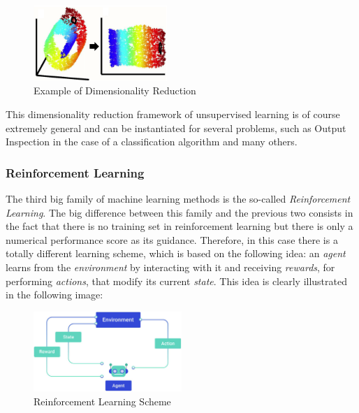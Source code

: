 \begin{itemize}
            \vspace{5mm}

            \begin{figure}[h]
                  \centering
                  \includegraphics[width=0.45\textwidth]{../img/Dim_reduction_example}
                  \caption{Example of Dimensionality Reduction}
            \end{figure}

            \vspace{5mm}

            This dimensionality reduction framework of unsupervised
            learning is of course extremely general and can be
            instantiated for several problems, such as Output Inspection
            in the case of a classification algorithm and many others.
\end{itemize}

\subsubsection{Reinforcement Learning}

The third big family of machine learning methods is the so-called
\emph{Reinforcement Learning}. The big difference between this
family and the previous two consists in the fact that there is no
training set in reinforcement learning but there is only a numerical
performance score as its guidance. Therefore, in this case there is a
totally different learning scheme, which is based on the following idea:
an \emph{agent} learns from the \emph{environment} by interacting with
it and receiving \emph{rewards}, for performing \emph{actions}, that
modify its current \emph{state}. This idea is clearly illustrated in the
following image:

\vspace{2mm}

\begin{figure}[h]
      \centering
      \includegraphics[width=0.5\textwidth]{../img/Reinforcement_learning}
      \caption{Reinforcement Learning Scheme}
\end{figure}

